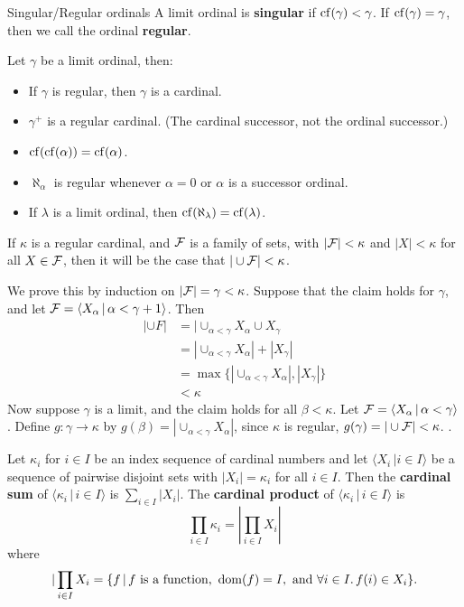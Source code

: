 \documentclass{article}
\begin{document}
\begin{fancydefine}{Singular/Regular ordinals}
    A limit ordinal is \textbf{singular} if $\operatorname{cf}(\gamma)<\gamma$. If $\operatorname{cf}(\gamma)=\gamma$, then we call the ordinal \textbf{regular}.
\end{fancydefine}
\begin{fancythm}
    Let $\gamma$ be a limit ordinal, then: \begin{itemize}
        \item If $\gamma$ is regular, then $\gamma$ is a cardinal.
        \item $\gamma^{+}$ is a regular cardinal. (The cardinal successor, not the ordinal successor.)
        \item $\operatorname{cf}(\operatorname{cf}(\alpha))=\operatorname{cf}(\alpha)$.
        \item $\aleph_{\alpha}$ is regular whenever $\alpha = 0$ or $\alpha$ is a successor ordinal.
        \item If $\lambda$ is a limit ordinal, then $\operatorname{cf}(\aleph_{\lambda}) = \operatorname{cf}(\lambda)$.
    \end{itemize}
\end{fancythm}
\begin{fancythm}{}
    If $\kappa$ is a regular cardinal, and $\mathcal{F}$ is a family of sets, with $|\mathcal{F}|<\kappa$ and $|X|<\kappa$ for all $X \in \mathcal{F}$, then it will be the case that $|\cup \mathcal{F}| < \kappa$.
\end{fancythm}
\proof We prove this by induction on $|\mathcal{F}| = \gamma < \kappa$. Suppose that the claim holds for $\gamma$, and let $\mathcal{F} = \langle X_{\alpha} \, | \, \alpha < \gamma + 1 \rangle$. Then \begin{align*}
    |\cup F| & = |\cup_{\alpha < \gamma} X_{\alpha} \cup X_{\gamma}           \\
             & = |\cup_{\alpha<\gamma} X_{\alpha}| + | X_{\gamma}|            \\
             & = \max \{ | \cup_{\alpha < \gamma} X_{\alpha}|, |X_{\gamma}|\} \\
             & <\kappa
\end{align*}
Now suppose $\gamma$ is a limit, and the claim holds for all $\beta<\kappa$. Let $\mathcal{F} = \langle X_{\alpha} \, | \, \alpha<\gamma \rangle$. Define $g : \gamma \to \kappa$ by $g(\beta) = |\cup_{\alpha<\gamma} X_{\alpha}|$, since $\kappa$ is regular, $g(\gamma) = |\cup \mathcal{F}| < \kappa$.
\endproof.
\begin{fancydefine}
    Let $\kappa_{i}$ for $i \in I$ be an index sequence of cardinal numbers and let $\langle X_{i} \, | i \in I\rangle$ be a sequence of pairwise disjoint sets with $|X_{i}| = \kappa_{i}$ for all $i \in I$. Then the \textbf{cardinal sum} of $\langle \kappa_{i} \, | \, i \in I \rangle$ is $\sum_{i \in I} |X_{i}|$.\gap
    The \textbf{cardinal product} of $\langle \kappa_{i} \, | \, i \in I\rangle$ is \[\prod_{i \in I}\kappa_{i} = |\prod_{i \in I} X_{i}|\] where \[|\prod_{i \in I} X_{i} = \{ f \, | \, f \text{ is a function, } \operatorname{dom}(f) = I, \text{ and } \forall i \in I. \, f(i) \in X_{i}\}.\]
\end{fancydefine}
\end{document}
